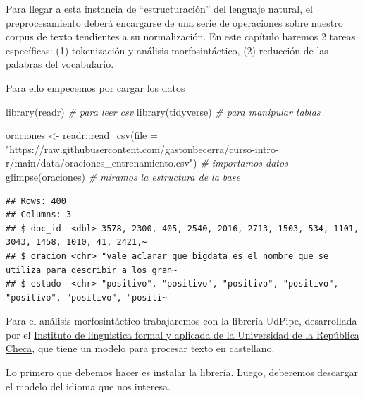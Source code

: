 \documentclass[
]{book}
\newenvironment{Shaded}{\begin{snugshade}}{\end{snugshade}}
\newcommand{\AttributeTok}[1]{\textcolor[rgb]{0.77,0.63,0.00}{#1}}
\newcommand{\CommentTok}[1]{\textcolor[rgb]{0.56,0.35,0.01}{\textit{#1}}}
\newcommand{\FunctionTok}[1]{\textcolor[rgb]{0.00,0.00,0.00}{#1}}
\newcommand{\NormalTok}[1]{#1}
\newcommand{\OtherTok}[1]{\textcolor[rgb]{0.56,0.35,0.01}{#1}}
\newcommand{\SpecialCharTok}[1]{\textcolor[rgb]{0.00,0.00,0.00}{#1}}
\newcommand{\StringTok}[1]{\textcolor[rgb]{0.31,0.60,0.02}{#1}}
\begin{document}
Para llegar a esta instancia de ``estructuración'' del lenguaje natural, el preprocesamiento deberá encargarse de una serie de operaciones sobre nuestro corpus de texto tendientes a su normalización. En este capítulo haremos 2 tareas específicas: (1) tokenización y análisis morfosintáctico, (2) reducción de las palabras del vocabulario.

Para ello empecemos por cargar los datos

\begin{Shaded}
\begin{Highlighting}[]
\FunctionTok{library}\NormalTok{(readr) }\CommentTok{\# para leer csv}
\FunctionTok{library}\NormalTok{(tidyverse) }\CommentTok{\# para manipular tablas}

\NormalTok{oraciones }\OtherTok{\textless{}{-}}\NormalTok{ readr}\SpecialCharTok{::}\FunctionTok{read\_csv}\NormalTok{(}\AttributeTok{file =} \StringTok{"https://raw.githubusercontent.com/gastonbecerra/curso{-}intro{-}r/main/data/oraciones\_entrenamiento.csv"}\NormalTok{) }\CommentTok{\# importamos datos}
\FunctionTok{glimpse}\NormalTok{(oraciones) }\CommentTok{\# miramos la estructura de la base}
\end{Highlighting}
\end{Shaded}

\begin{verbatim}
## Rows: 400
## Columns: 3
## $ doc_id  <dbl> 3578, 2300, 405, 2540, 2016, 2713, 1503, 534, 1101, 3043, 1458, 1010, 41, 2421,~
## $ oracion <chr> "vale aclarar que bigdata es el nombre que se utiliza para describir a los gran~
## $ estado  <chr> "positivo", "positivo", "positivo", "positivo", "positivo", "positivo", "positi~
\end{verbatim}

Para el análisis morfosintáctico trabajaremos con la librería UdPipe, desarrollada por el \href{https://ufal.mff.cuni.cz/udpipe}{Instituto de linguistica formal y aplicada de la Universidad de la República Checa}, que tiene un modelo para procesar texto en castellano.

Lo primero que debemos hacer es instalar la librería. Luego, deberemos descargar el modelo del idioma que nos interesa.

\begin{Shaded}
\end{Shaded}
\end{document}
